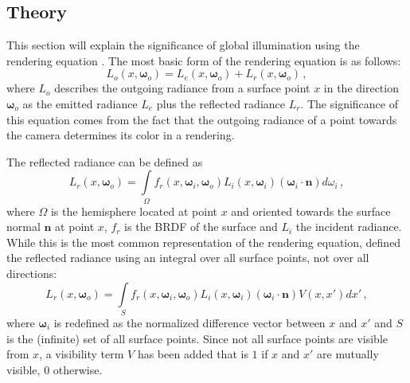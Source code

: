 \subsection{Theory}
\label{sec:intro:gi:theory}


\newcommand{\dir}{\bm{\omega}} %

\newcommand{\outgoingDir}{ \dir_o}
\newcommand{\incidenceDir}{\dir_i}

\newcommand{\outgoingRadiance}{  L_o(x, \outgoingDir)}
\newcommand{\emittedRadiance}{   L_e(x, \outgoingDir)}
\newcommand{\reflectedRadiance}{ L_r(x, \outgoingDir)}
\newcommand{\incidentRadiance}{  L_i(x, \incidenceDir)}

\newcommand{\brdf}{f_r} %

\newcommand{\surfaceNormal}{\bm{n}}

This section will explain the significance of global illumination using the rendering equation \citep{Kajiya:1986:RenderingEquation}. The most basic form of the rendering equation is as follows:
%
\begin{equation}
\outgoingRadiance = \emittedRadiance + \reflectedRadiance\,,
\label{eq:renderBasic}
\end{equation}
%
where $L_o$ describes the outgoing radiance from a surface point $x$ in the direction $\outgoingDir$ as the emitted radiance $L_e$ plus the reflected radiance $L_r$. The significance of this equation comes from the fact that the outgoing radiance of a point towards the camera determines its color in a rendering.

The reflected radiance can be defined as
%
\begin{equation}
\reflectedRadiance = \int\limits_{\Omega} \brdf(x, \incidenceDir, \outgoingDir)\incidentRadiance (\incidenceDir \cdot \surfaceNormal) d \omega_i\,,
\label{eq:render}
\end{equation}
%
where $\Omega$ is the hemisphere located at point $x$ and oriented towards the surface normal $\surfaceNormal$ at point $x$, $\brdf$ is the BRDF of the surface and $L_i$ the incident radiance. While this is the most common representation of the rendering equation, \citet{Kajiya:1986:RenderingEquation} defined the reflected radiance using an integral over all surface points, not over all directions:
%
  \begin{equation}
    \reflectedRadiance = \int\limits_{S} \brdf(x, \incidenceDir, \outgoingDir) \incidentRadiance (\incidenceDir \cdot \surfaceNormal) V(x, x') d x'\,,
  \label{eq:renderWithVisibility}
  \end{equation}
%
where $\incidenceDir$ is redefined as the normalized difference vector between $x$ and $x'$ and $S$ is the (infinite) set of all surface points. Since not all surface points are visible from $x$, a visibility term $V$ has been added that is $1$ if $x$ and $x'$ are mutually visible, $0$ otherwise.

